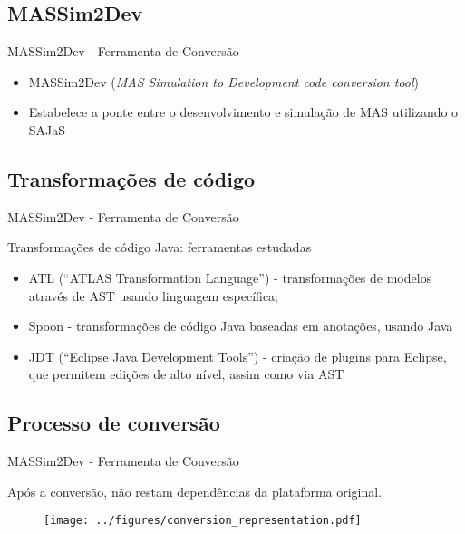
\subsection{MASSim2Dev}
\begin{frame}{MASSim2Dev - Ferramenta de Conversão}

	\begin{itemize}
	\item MASSim2Dev (\emph{MAS Simulation to Development code conversion tool})
	\item Estabelece a ponte entre o desenvolvimento e simulação de MAS utilizando o SAJaS
	\end{itemize}
\end{frame}

\subsection{Transformações de código}
\begin{frame}{MASSim2Dev - Ferramenta de Conversão}

	Transformações de código Java: ferramentas estudadas

	\begin{itemize}
	\item ATL (``ATLAS Transformation Language'') - transformações de modelos através de AST usando linguagem específica;
	\item Spoon - transformações de código Java baseadas em anotações, usando Java
	\item \color{FEUPCor} JDT (``Eclipse Java Development Tools'') - criação de plugins para Eclipse, que permitem edições de alto nível, assim como via AST

	\end{itemize}
\end{frame}

\subsection{Processo de conversão}
\begin{frame}{MASSim2Dev - Ferramenta de Conversão}

	Após a conversão, não restam dependências da plataforma original.
	\begin{figure}[h]
		\centering
		\texttt{[image: ../figures/conversion\_representation.pdf]}
	\end{figure}
\end{frame}

